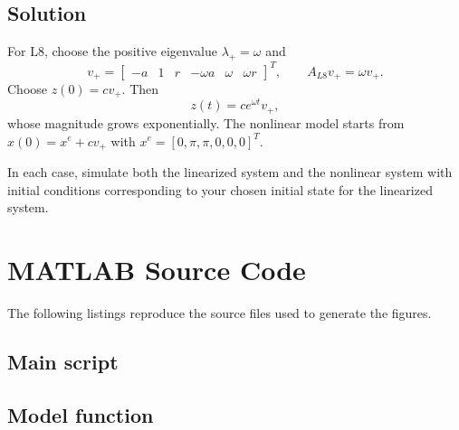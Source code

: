 \documentclass[12pt,a4paper]{article}
\begin{document}
\subsection*{Solution}
For L8, choose the positive eigenvalue $\lambda_+=\omega$ and
\[
v_+=\begin{bmatrix}-a&1&r&-\omega a&\omega&\omega r\end{bmatrix}^{T},
\qquad A_{L8}v_+=\omega v_+.
\]
Choose $z(0)=cv_+$. Then
\[
z(t)=ce^{\omega t}v_+,
\]
whose magnitude grows exponentially. The nonlinear model starts from
$x(0)=x^e+cv_+$ with $x^e=[0,\pi,\pi,0,0,0]^T$.



In each case, simulate both the linearized system and the nonlinear system with initial conditions corresponding to your chosen initial state for the linearized system.


\clearpage
\section*{MATLAB Source Code}
The following listings reproduce the source files used to generate the figures.
\subsection*{Main script}

\clearpage
\subsection*{Model function}

\end{document}
